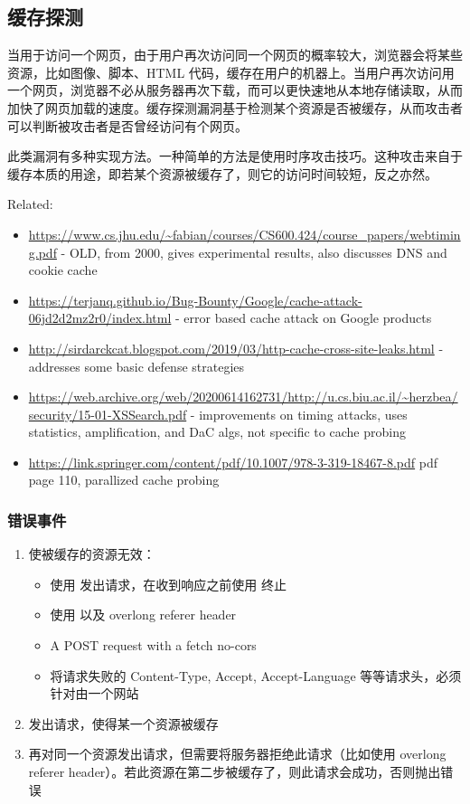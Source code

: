 \subsection{缓存探测}\label{sec:cache}

当用于访问一个网页，由于用户再次访问同一个网页的概率较大，浏览器会将某些资源，比如图像、脚本、HTML 代码，缓存在用户的机器上。当用户再次访问用一个网页，浏览器不必从服务器再次下载，而可以更快速地从本地存储读取，从而加快了网页加载的速度。缓存探测漏洞基于检测某个资源是否被缓存，从而攻击者可以判断被攻击者是否曾经访问有个网页。

此类漏洞有多种实现方法。一种简单的方法是使用时序攻击技巧。这种攻击来自于缓存本质的用途，即若某个资源被缓存了，则它的访问时间较短，反之亦然。


Related:

\begin{itemize}
    \item \url{https://www.cs.jhu.edu/~fabian/courses/CS600.424/course_papers/webtiming.pdf} - OLD, from 2000, gives experimental results, also discusses DNS and cookie cache
    \item \url{https://terjanq.github.io/Bug-Bounty/Google/cache-attack-06jd2d2mz2r0/index.html} - error based cache attack on Google products
    \item \url{http://sirdarckcat.blogspot.com/2019/03/http-cache-cross-site-leaks.html} - addresses some basic defense strategies
    \item \url{https://web.archive.org/web/20200614162731/http://u.cs.biu.ac.il/~herzbea/security/15-01-XSSearch.pdf} - improvements on timing attacks, uses statistics, amplification, and DaC algs, not specific to cache probing
    \item \url{https://link.springer.com/content/pdf/10.1007/978-3-319-18467-8.pdf} pdf page 110, parallized cache probing
\end{itemize}

\subsubsection{错误事件}

\begin{enumerate}
    \item 使被缓存的资源无效：
    \begin{itemize}
        \item 使用  发出请求，在收到响应之前使用  终止
        \item 使用  以及 overlong referer header
        \item A POST request with a fetch no-cors
        \item 将请求失败的 Content-Type, Accept, Accept-Language 等等请求头，必须针对由一个网站
    \end{itemize}
    \item 发出请求，使得某一个资源被缓存
    \item 再对同一个资源发出请求，但需要将服务器拒绝此请求（比如使用 overlong referer header）。若此资源在第二步被缓存了，则此请求会成功，否则抛出错误
\end{enumerate}

